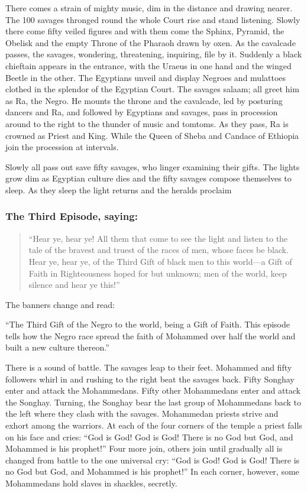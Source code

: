 \documentclass[letterpaper,10pt,english]{jupyterBook}
\begin{document}
\sphinxAtStartPar
There comes a strain of mighty music, dim in the distance and drawing nearer. The 100 savages thronged round the whole Court rise and stand listening. Slowly there come fifty veiled figures and with them come the Sphinx, Pyramid, the Obelisk and the empty Throne of the Pharaoh drawn by oxen. As the cavalcade passes, the savages, wondering, threatening, inquiring, file by it. Suddenly a black chieftain appears in the entrance, with the Uraeus in one hand and the winged Beetle in the other. The Egyptians unveil and display Negroes and mulattoes clothed in the splendor of the Egyptian Court. The savages salaam; all greet him as Ra, the Negro. He mounts the throne and the cavalcade, led by posturing dancers and Ra, and followed by Egyptians and savages, pass in procession around to the right to the thunder of music and tomtoms. As they pass, Ra is crowned as Priest and King. While the Queen of Sheba and Candace of Ethiopia join the procession at intervals.

\sphinxAtStartPar
Slowly all pass out save fifty savages, who linger examining their gifts. The lights grow dim as Egyptian culture dies and the fifty savages compose themselves to sleep. As they sleep the light returns and the heralds proclaim


\subsubsection{The Third Episode, saying:}
\label{\detokenize{Volumes/06/07/national_emancipation_exposition:the-third-episode-saying}}\begin{quote}

\sphinxAtStartPar
“Hear ye, hear ye! All them that come to see the light and listen to the tale of the bravest and truest of the races of men, whose faces be black. Hear ye, hear ye, of the Third Gift of black men to this world—a Gift of Faith in Righteousness hoped for but unknown; men of the world, keep silence and hear ye this!”
\end{quote}

\sphinxAtStartPar
The banners change and read:

\sphinxAtStartPar
“The Third Gift of the Negro to the world, being a Gift of Faith. This episode tells how the Negro race spread the faith of Mohammed over half the world and built a new culture thereon.”

\sphinxAtStartPar
There is a sound of battle. The savages leap to their feet. Mohammed and fifty followers whirl in and rushing to the right beat the savages back. Fifty Songhay enter and attack the Mohammedans. Fifty other Mohammedans enter and attack the Songhay. Turning, the Songhay bear the last group of Mohammedans back to the left where they clash with the savages. Mohammedan priests strive and exhort among the warriors. At each of the four corners of the temple a priest falls on his face and cries: “God is God! God is God! There is no God but God, and Mohammed is his prophet!” Four more join, others join until gradually all is changed from battle to the one universal cry: “God is God! God is God! There is no God but God, and Mohammed is his prophet!” In each corner, however, some Mohammedans hold slaves in shackles, secretly.
\end{document}
